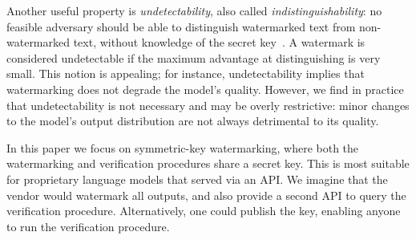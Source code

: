 Another useful property is \emph{undetectability}, also called \emph{indistinguishability}:
%
no feasible adversary should be able to distinguish watermarked text from non-watermarked text, without knowledge of the secret key~\citep{christ_undetectable_2023}. 
%
A watermark is considered undetectable if the maximum advantage at distinguishing is very small.
%
This notion is appealing; for instance, undetectability implies that watermarking does not degrade the model's quality.
%
However, we find in practice that undetectability is not necessary and may be overly restrictive:
%
minor changes to the model's output distribution are not always detrimental to its quality.

In this paper we focus on symmetric-key watermarking, where both the watermarking and verification procedures share a secret key.
%
This is most suitable for proprietary language models that served via an API.
%
We imagine that the vendor would watermark all outputs, and also provide a second API to query the verification procedure.
%
Alternatively, one could publish the key, enabling anyone to run the verification procedure.
%
